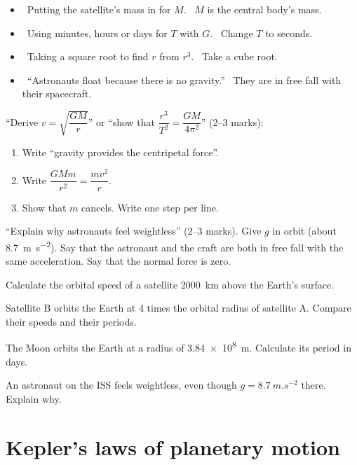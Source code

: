 \begin{mistakes}
\begin{itemize}
  \item \xmark\ Putting the satellite's mass in for $M$. \cmark\ $M$ is the central body's mass.
  \item \xmark\ Using minutes, hours or days for $T$ with $G$. \cmark\ Change $T$ to seconds.
  \item \xmark\ Taking a square root to find $r$ from $r^3$. \cmark\ Take a cube root.
  \item \xmark\ ``Astronauts float because there is no gravity.'' \cmark\ They are in free fall
        with their spacecraft.
\end{itemize}
\end{mistakes}

\begin{examtip}
``Derive $v = \sqrt{\dfrac{GM}{r}}$'' or ``show that $\dfrac{r^3}{T^2} = \dfrac{GM}{4\pi^2}$''
(2--3 marks):
\begin{enumerate}
  \item Write ``gravity provides the centripetal force''.
  \item Write $\dfrac{GMm}{r^2} = \dfrac{mv^2}{r}$.
  \item Show that $m$ cancels. Write one step per line.
\end{enumerate}
``Explain why astronauts feel weightless'' (2--3 marks). Give $g$ in orbit (about
\qty{8.7}{m.s^{-2}}). Say that the astronaut and the craft are both in free fall with the same
acceleration. Say that the normal force is zero.
\end{examtip}

\begin{quickcheck}
  \item Calculate the orbital speed of a satellite \qty{2000}{km} above the Earth's surface.
  \item Satellite B orbits the Earth at 4 times the orbital radius of satellite A. Compare their
        speeds and their periods.
  \item The Moon orbits the Earth at a radius of \qty{3.84e8}{m}. Calculate its period in days.
  \item An astronaut on the ISS feels weightless, even though $g = \qty{8.7}{m.s^{-2}}$ there.
        Explain why.
\end{quickcheck}

\section{Kepler's laws of planetary motion}\label{ch4:sec:kepler}


